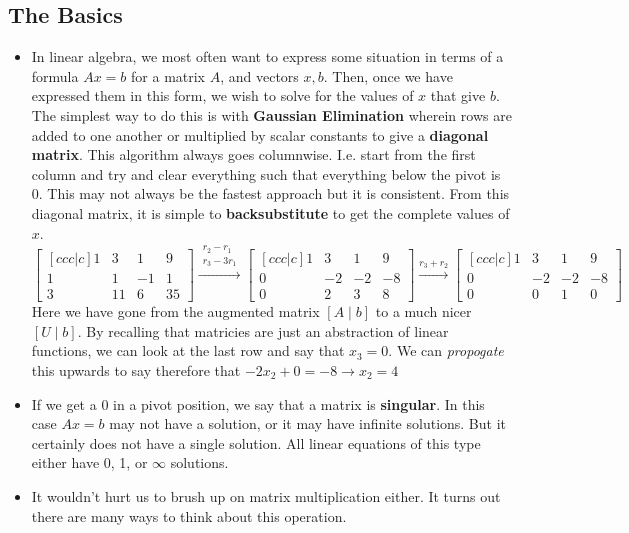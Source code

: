 \documentclass[11pt]{article}
\begin{document}
\subsection{The Basics}
\begin{itemize}
	\item    In linear algebra, we most often want to express some situation in terms of a formula $Ax=b$ for a matrix $A$, and vectors $x, b$. Then, once we have expressed them in this form, we wish to solve for the values of $x$ that give $b$. The simplest way to do this is with \textbf{Gaussian Elimination} wherein rows are added to one another or multiplied by scalar constants to give a \textbf{diagonal matrix}. This algorithm always goes columnwise. I.e. start from the first column and try and clear everything such that everything below the pivot is 0. This may not always be the fastest approach but it is consistent. From this diagonal matrix, it is simple to \textbf{backsubstitute} to get the complete values of $x$.
		$$\begin{bmatrix}[ccc|c]
  1 & 3 & 1 & 9\\
1 & 1 & -1 & 1\\
3 & 11 & 6 & 35
\end{bmatrix} \xrightarrow{\substack{r_{2}-r_{1} \\ r_{3}-3r_{1}}} \begin{bmatrix}[ccc|c]
  1 & 3 & 1 & 9\\
0 & -2 & -2 & -8\\
0 & 2 & 3 & 8
\end{bmatrix} \xrightarrow{r_{3}+r_{2}}\begin{bmatrix}[ccc|c]
  1 & 3 & 1 & 9\\
0 & -2 & -2 & -8\\
0 & 0 & 1 & 0
\end{bmatrix}$$
Here we have gone from the augmented matrix $[ A \mid b]$ to a much nicer $[U \mid b]$. By recalling that matricies are just an abstraction of linear functions, we can look at the last row and say that $x_{3}=0$. We can \textit{propogate} this upwards to say therefore that $-2x_{2}+0=-8 \to x_{2}=4$
\item If we get a 0 in a pivot position, we say that a matrix is \textbf{singular}. In this case $Ax=b$ may not have a solution, or it may have infinite solutions. But it certainly does not have a single solution. All linear equations of this type either have 0, 1, or $\infty$ solutions.
\item It wouldn't hurt us to brush up on matrix multiplication either. It turns out there are many ways to think about this operation.

\end{itemize}
\end{document}
